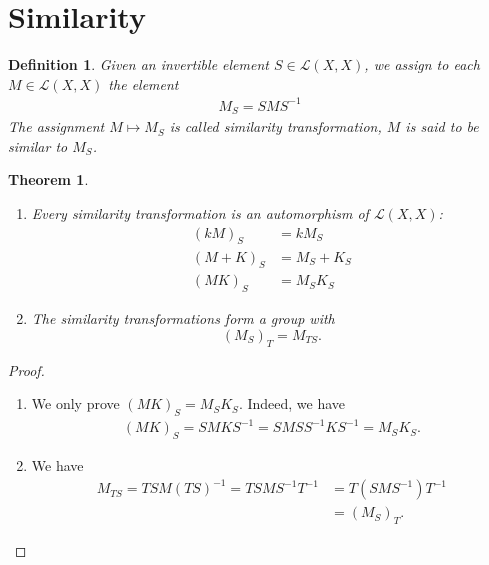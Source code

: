 \documentclass[11pt]{book}
\newtheorem{definition}{Definition}[section]
\newtheorem{theorem}{Theorem}[section]
\theoremstyle{definition}
\numberwithin{equation}{chapter}
\begin{document}
\medskip

\section{Similarity}
\begin{definition}\label{similarity}
Given an invertible element $S\in \mathscr{L}(X, X)$, we assign to each $M\in \mathscr{L}(X,X)$ the element
\begin{align*}
    M_S = SMS^{-1}
\end{align*}
The assignment $M\mapsto M_S$ is called similarity transformation, $M$ is said to be similar to $M_S$.
\end{definition}

\medskip

\begin{theorem}
~\begin{enumerate}[label=(\alph*)]
    \item Every similarity transformation is an automorphism of $\mathscr{L}(X,X)$:
    \begin{align*}
        (kM)_S & = kM_S\\
        (M+K)_S & = M_S + K_S\\
        (MK)_S & = M_S K_S
    \end{align*}
    \item The similarity transformations form a group with $$(M_S)_T = M_{TS}.$$
\end{enumerate}
\end{theorem}
\begin{proof}
~\begin{enumerate}[label=(\alph*)]
    \item We only prove $(MK)_S = M_S K_S$. Indeed, we have 
    \begin{align*}
        (MK)_S = S M K S^{-1} = S M S S^{-1} K S^{-1} = M_S K_S.
    \end{align*}
    \item We have 
    \begin{align*}
        M_{TS} = TS M (TS)^{-1} = TS M S^{-1} T^{-1} & = T(S M S^{-1}) T^{-1} \\
        & = (M_S)_T.
    \end{align*}
\end{enumerate}
\end{proof}

\medskip
\end{document}
